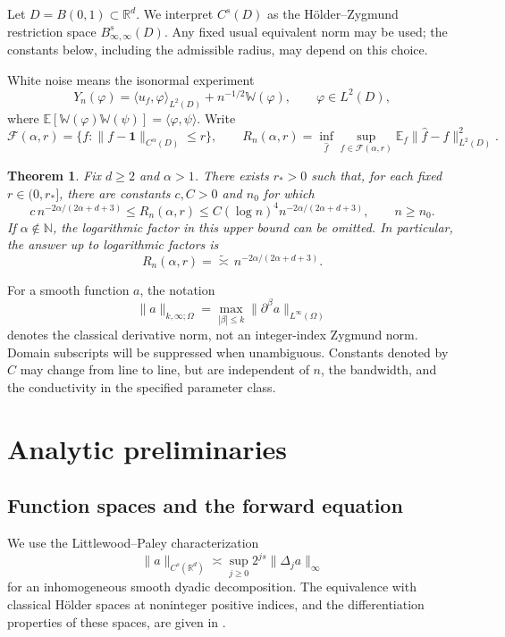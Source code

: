 \documentclass[11pt]{article}
\newtheorem{theorem}{Theorem}[section]
\theoremstyle{remark}
\newcommand{\R}{\mathbb R}
\newcommand{\E}{\mathbb E}
\newcommand{\one}{\mathbf 1}
\newcommand{\cF}{\mathcal F}
\begin{document}
Let \(D=B(0,1)\subset\R^d\). We interpret \(C^s(D)\) as the
H\"older--Zygmund restriction space \(B^s_{\infty,\infty}(D)\).
Any fixed usual equivalent norm may be used; the constants below,
including the admissible radius, may depend on this choice.

White noise means the isonormal experiment
\[
Y_n(\varphi)=\langle u_f,\varphi\rangle_{L^2(D)}
+n^{-1/2}\mathbb W(\varphi),\qquad \varphi\in L^2(D),
\]
where
\(\E[\mathbb W(\varphi)\mathbb W(\psi)]=\langle\varphi,\psi\rangle\).
Write
\[
\cF(\alpha,r)=
\{f:\|f-\one\|_{C^\alpha(D)}\leq r\},
\qquad
R_n(\alpha,r)=
\inf_{\widehat f}\sup_{f\in\cF(\alpha,r)}
\E_f\|\widehat f-f\|_{L^2(D)}^2.
\]

\begin{theorem}\label{thm:main}
Fix \(d\geq2\) and \(\alpha>1\). There exists \(r_*>0\) such that,
for each fixed \(r\in(0,r_*]\), there are constants
\(c,C>0\) and \(n_0\) for which
\[
c\,n^{-2\alpha/(2\alpha+d+3)}
\leq R_n(\alpha,r)
\leq
C(\log n)^4 n^{-2\alpha/(2\alpha+d+3)},
\qquad n\geq n_0.
\]
If \(\alpha\notin\mathbb N\), the logarithmic factor in this upper bound
can be omitted. In particular, the answer up to logarithmic factors is
\[
\boxed{\displaystyle
R_n(\alpha,r)=\widetilde{\asymp}\,
n^{-2\alpha/(2\alpha+d+3)}.}
\]
\end{theorem}

For a smooth function \(a\), the notation
\[
\|a\|_{k,\infty;\Omega}
=\max_{|\beta|\leq k}\|\partial^\beta a\|_{L^\infty(\Omega)}
\]
denotes the classical derivative norm, not an integer-index Zygmund
norm. Domain subscripts will be suppressed when unambiguous.
Constants denoted by \(C\) may change from line to line, but are
independent of \(n\), the bandwidth, and the conductivity in the
specified parameter class.

\section{Analytic preliminaries}

\subsection{Function spaces and the forward equation}

We use the Littlewood--Paley characterization
\begin{equation}\label{eq:LP}
\|a\|_{C^s(\R^d)}
\asymp \sup_{j\geq0}2^{js}\|\Delta_j a\|_\infty
\end{equation}
for an inhomogeneous smooth dyadic decomposition. The equivalence with
classical H\"older spaces at noninteger positive indices, and the
differentiation properties of these spaces, are given in
\cite[Chapter~13, Section~8]{Taylor}.
\end{document}
